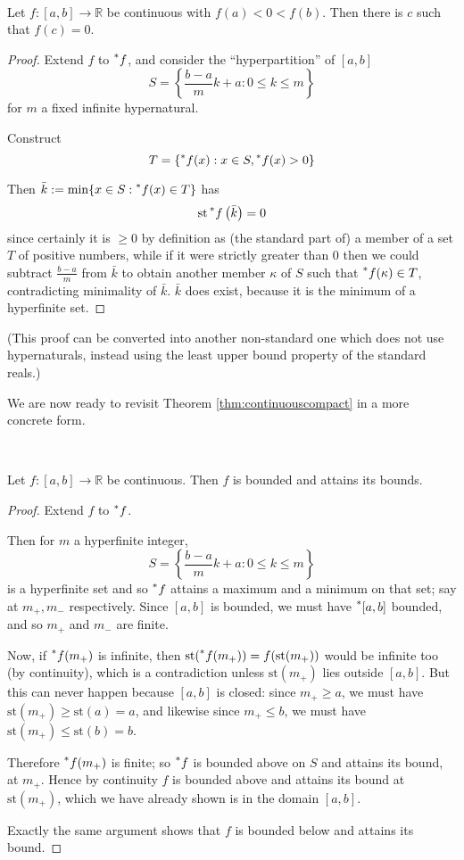 \documentclass[11pt]{amsart}
\theoremstyle{remark}
\newcommand{\st}{\mathrm{st}}
\newcommand{\hyp}[1][\mathbb{R}]{\prescript{*}{}{#1}}
\begin{document}
\

\begin{thm}
Let $f: [a, b] \to \mathbb{R}$ be continuous with $f(a) < 0 < f(b)$. Then there is $c$ such that $f(c) = 0$.
\end{thm}
\begin{proof}
Extend $f$ to $\hyp[f]$, and consider the ``hyperpartition'' of $[a,b]$ $$S = \left \{ \frac{b-a}{m} k + a : 0 \leq k \leq m \right\}$$ for $m$ a fixed infinite hypernatural.

Construct $$T = \left \{ \hyp[f](x): x \in S, \hyp[f](x) > 0 \right \}$$

Then $\bar{k} := \min \{ x \in S: \hyp[f](x) \in T \}$ has $$\st \hyp[f]\left(\bar{k} \right) = 0$$
since certainly it is $\geq 0$ by definition as (the standard part of) a member of a set $T$ of positive numbers, while if it were strictly greater than $0$ then we could subtract $\frac{b-a}{m}$ from $\bar{k}$ to obtain another member $\kappa$ of $S$ such that $\hyp[f](\kappa) \in T$, contradicting minimality of $\bar{k}$.
$\bar{k}$ does exist, because it is the minimum of a hyperfinite set.
\end{proof}

(This proof can be converted into another non-standard one which does not use hypernaturals, instead using the least upper bound property of the standard reals.)

We are now ready to revisit Theorem \ref{thm:continuouscompact} in a more concrete form.

\

\begin{thm} \label{thm:ACFOACBIIBAAIB} Let $f: [a, b] \to \mathbb{R}$ be continuous. Then $f$ is bounded and attains its bounds.
\end{thm}
\begin{proof}
Extend $f$ to $\hyp[f]$.

Then for $m$ a hyperfinite integer, $$S = \left \{ \frac{b-a}{m} k + a : 0 \leq k \leq m \right\}$$ is a hyperfinite set and so $\hyp[f]$ attains a maximum and a minimum on that set; say at $m_+, m_-$ respectively.
Since $[a,b]$ is bounded, we must have $\hyp[[]a, b]$ bounded, and so $m_+$ and $m_-$ are finite.

Now, if $\hyp[f](m_+)$ is infinite, then $\st(\hyp[f](m_+)) = f(\st(m_+))$ would be infinite too (by continuity), which is a contradiction unless $\st(m_+)$ lies outside $[a,b]$.
But this can never happen because $[a,b]$ is closed: since $m_+ \geq a$, we must have $\st(m_+) \geq \st(a) = a$, and likewise since $m_+ \leq b$, we must have $\st(m_+) \leq \st(b) = b$.

Therefore $\hyp[f](m_+)$ is finite; so $\hyp[f]$ is bounded above on $S$ and attains its bound, at $m_+$.
Hence by continuity $f$ is bounded above and attains its bound at $\st(m_+)$, which we have already shown is in the domain $[a,b]$.

Exactly the same argument shows that $f$ is bounded below and attains its bound.
\end{proof}
\end{document}
